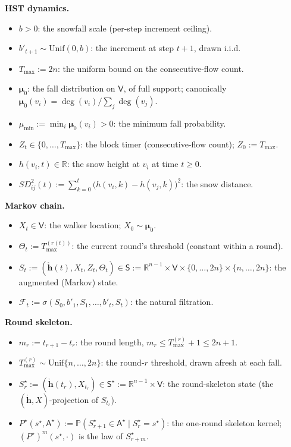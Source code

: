 \documentclass[11pt]{article}
\theoremstyle{definition}
\begin{document}
\noindent\textbf{HST dynamics.}
\begin{itemize}
  \item $b > 0$: the snowfall scale (per-step increment ceiling).
  \item $b'_{t+1} \sim \mathrm{Unif}(0, b)$: the increment at step $t+1$, drawn i.i.d.
  \item $T_{\max} := 2n$: the uniform bound on the consecutive-flow count.
  \item $\boldsymbol{\mu}_0$: the fall distribution on $\mathsf{V}$, of full support; canonically $\boldsymbol{\mu}_0(v_i) = \deg(v_i)/\sum_j \deg(v_j)$.
  \item $\mu_{\min} := \min_i \boldsymbol{\mu}_0(v_i) > 0$: the minimum fall probability.
  \item $Z_t \in \{0, \ldots, T_{\max}\}$: the block timer (consecutive-flow count); $Z_0 := T_{\max}$.
  \item $h(v_i, t) \in \mathbb{R}$: the snow height at $v_i$ at time $t \geq 0$.
  \item $SD^2_{ij}(t) := \sum_{k=0}^{t} \bigl(h(v_i, k) - h(v_j, k)\bigr)^2$: the snow distance.
\end{itemize}

\noindent\textbf{Markov chain.}
\begin{itemize}
  \item $X_t \in \mathsf{V}$: the walker location; $X_0 \sim \boldsymbol{\mu}_0$.
  \item $\Theta_t := T_{\max}^{(r(t))}$: the current round's threshold (constant within a round).
  \item $S_t := (\mathring{\mathbf{h}}(t), X_t, Z_t, \Theta_t) \in \mathsf{S} := \mathbb{R}^{n-1} \times \mathsf{V} \times \{0, \ldots, 2n\} \times \{n, \ldots, 2n\}$: the augmented (Markov) state.
  \item $\mathcal{F}_t := \sigma(S_0, b'_1, S_1, \ldots, b'_t, S_t)$: the natural filtration.
\end{itemize}

\noindent\textbf{Round skeleton.}
\begin{itemize}
  \item $m_r := t_{r+1} - t_r$: the round length, $m_r \leq T_{\max}^{(r)} + 1 \leq 2n + 1$.
  \item $T_{\max}^{(r)} \sim \mathrm{Unif}\{n, \ldots, 2n\}$: the round-$r$ threshold, drawn afresh at each fall.
  \item $S^{\star}_r := (\mathring{\mathbf{h}}(t_r), X_{t_r}) \in \mathsf{S}^{\star} := \mathbb{R}^{n-1} \times \mathsf{V}$: the round-skeleton state (the $(\mathring{\mathbf{h}}, X)$-projection of $S_{t_r}$).
  \item $P^{\star}(s^{\star}, \mathsf{A}^{\star}) := \mathbb{P}(S^{\star}_{r+1} \in \mathsf{A}^{\star} \mid S^{\star}_r = s^{\star})$: the one-round skeleton kernel; $(P^{\star})^m(s^{\star}, \cdot)$ is the law of $S^{\star}_{r+m}$.
\end{itemize}
\end{document}
